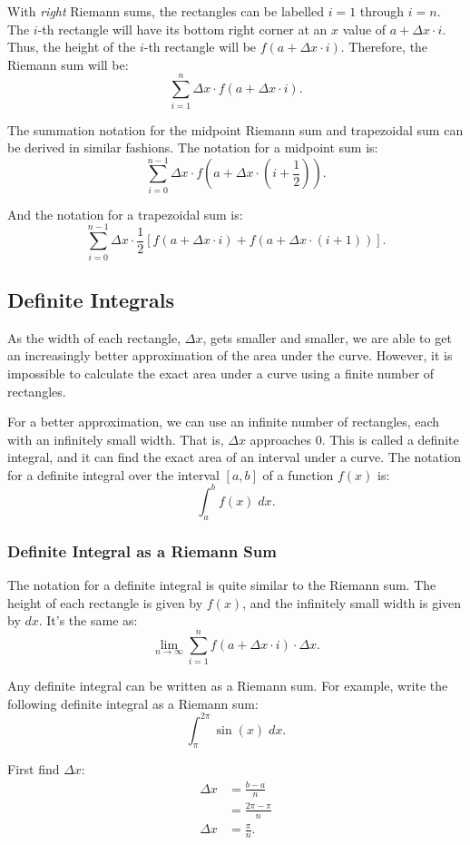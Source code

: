 \documentclass[12pt]{article}
\begin{document}
With \textit{right} Riemann sums, the rectangles can be labelled $i = 1$ through $i = n$. The $i$-th rectangle will have its bottom right corner at an $x$ value of $a + \Delta x \cdot i$. Thus, the height of the $i$-th rectangle will be $f(a + \Delta x \cdot i)$. Therefore, the Riemann sum will be:
\[ \sum_{i = 1}^n \Delta x \cdot f(a + \Delta x \cdot i). \]

The summation notation for the midpoint Riemann sum and trapezoidal sum can be derived in similar fashions. The notation for a midpoint sum is:
\[ \sum_{i = 0}^{n - 1} \Delta x \cdot f \left( a + \Delta x \cdot \left( i + \frac{1}{2} \right) \right). \]

\noindent And the notation for a trapezoidal sum is:
\[ \sum_{i = 0}^{n - 1} \Delta x \cdot \frac{1}{2} \left[ f(a + \Delta x \cdot i) + f(a + \Delta x \cdot (i + 1)) \right]. \]

\subsection{Definite Integrals}
As the width of each rectangle, $\Delta x$, gets smaller and smaller, we are able to get an increasingly better approximation of the area under the curve. However, it is impossible to calculate the exact area under a curve using a finite number of rectangles.

For a better approximation, we can use an infinite number of rectangles, each with an infinitely small width. That is, $\Delta x$ approaches $0$. This is called a definite integral, and it can find the exact area of an interval under a curve. The notation for a definite integral over the interval $[a, b]$ of a function $f(x)$ is:
\[ \int_a^b f(x) \; dx. \]

\subsubsection{Definite Integral as a Riemann Sum}
The notation for a definite integral is quite similar to the Riemann sum. The height of each rectangle is given by $f(x)$, and the infinitely small width is given by $dx$. It's the same as:
\[ \lim_{n \to \infty} \sum_{i = 1}^n f(a + \Delta x \cdot i) \cdot \Delta x. \]

Any definite integral can be written as a Riemann sum. For example, write the following definite integral as a Riemann sum:
\[ \int_\pi^{2 \pi} \sin(x) \; dx. \]

\noindent First find $\Delta x$:
\begin{align*}
	\Delta x &= \frac{b - a}{n} \\[5pt]
	&= \frac{2 \pi - \pi}{n} \\[5pt]
	\Delta x &= \frac{\pi}{n}.
\end{align*}
\end{document}
